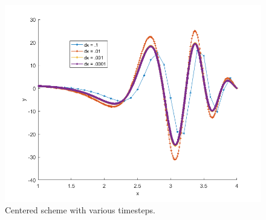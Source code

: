 \documentclass[]{article}
\theoremstyle{definition}
\numberwithin{equation}{section}
\begin{document}
		\begin{center}
		\begin{figure}[H]
			\centering
			\includegraphics[scale=.7]{ex7_fig.png} 
			\caption{Centered scheme with various timesteps.}
			\label{fig:2ndorder2}
		\end{figure}
	\end{center}

\end{document}
